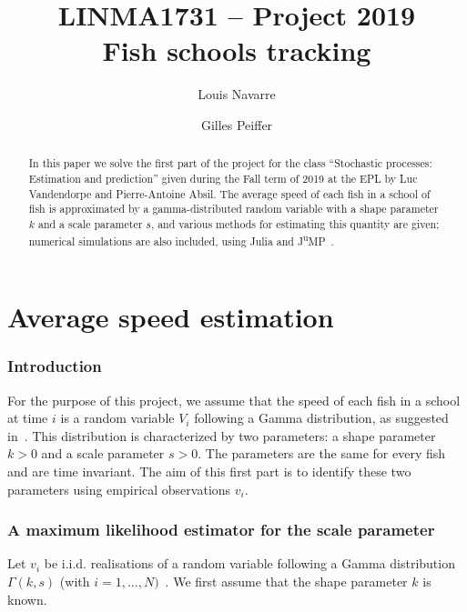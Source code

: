 \documentclass[final]{aomart}
\title[Fish schools tracking]{LINMA1731 -- Project 2019\\
Fish schools tracking}
\author{Louis Navarre}
\author{Gilles Peiffer}
\newtheorem[{}\it]{thm}{Theorem}[section]
\theoremstyle{definition}
\newtheorem*[{}\it]{notation}{Notation}
\numberwithin{equation}{section}
\begin{document}
\begin{abstract}
	In this paper we solve the first part of the project for the class ``Stochastic processes: Estimation and prediction'' given during the Fall term of 2019 at the EPL by Luc Vandendorpe and Pierre-Antoine Absil.
	The average speed of each fish in a school of fish is approximated by a gamma-distributed random variable with a shape parameter \(k\) and a scale parameter \(s\), and various methods for estimating this quantity are given; numerical simulations are also included, using Julia and J\textsuperscript{u}MP~\cite{DunningHuchetteLubin2017}.
\end{abstract}

\maketitle
\tableofcontents
\newpage

\part{Average speed estimation}
\section{Introduction}
For the purpose of this project, we assume that the speed of each fish in a school
at time \(i\) is a random variable \(V_i\) following a Gamma distribution, as suggested in~\cite{huth:sim}.
This distribution is characterized by two parameters:
a shape parameter \(k > 0\) and a scale parameter \(s > 0\).
The parameters are the same for every fish and are time invariant.
The aim of this first part is to identify these two parameters using empirical observations \(v_i\).

\section{A maximum likelihood estimator for the scale parameter}
\label{sec:s_est}
Let \(v_i\) be i.i.d. realisations of a random variable following a Gamma distribution \(\Gamma(k, s)\) (with \(i = 1,\ldots, N)\)~\cite{wiki:gamma}.
We first assume that the shape parameter \(k\) is known.
\end{document}
